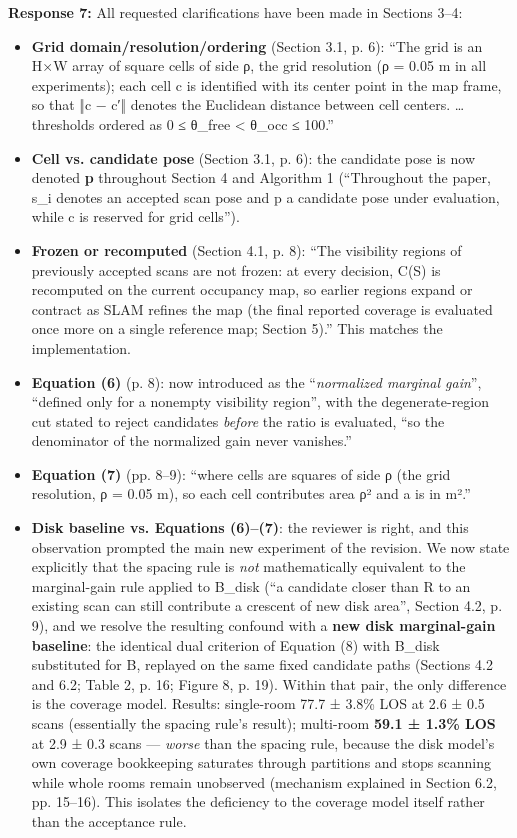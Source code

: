\documentclass[11pt]{article}
\begin{document}
\textbf{Response 7:} All requested clarifications have been made in Sections 3–4:
\begin{itemize}
\item \textbf{Grid domain/resolution/ordering} (Section 3.1, p. 6): “The grid is an H×W array of square cells of side ρ, the grid resolution (ρ = 0.05 m in all experiments); each cell c is identified with its center point in the map frame, so that ‖c − c′‖ denotes the Euclidean distance between cell centers. … thresholds ordered as 0 ≤ θ\_free < θ\_occ ≤ 100.”
\item \textbf{Cell vs. candidate pose} (Section 3.1, p. 6): the candidate pose is now denoted \textbf{p} throughout Section 4 and Algorithm 1 (“Throughout the paper, s\_i denotes an accepted scan pose and p a candidate pose under evaluation, while c is reserved for grid cells”).
\item \textbf{Frozen or recomputed} (Section 4.1, p. 8): “The visibility regions of previously accepted scans are not frozen: at every decision, C(S) is recomputed on the current occupancy map, so earlier regions expand or contract as SLAM refines the map (the final reported coverage is evaluated once more on a single reference map; Section 5).” This matches the implementation.
\item \textbf{Equation (6)} (p. 8): now introduced as the “\emph{normalized marginal gain}”, “defined only for a nonempty visibility region”, with the degenerate-region cut stated to reject candidates \emph{before} the ratio is evaluated, “so the denominator of the normalized gain never vanishes.”
\item \textbf{Equation (7)} (pp. 8–9): “where cells are squares of side ρ (the grid resolution, ρ = 0.05 m), so each cell contributes area ρ² and a is in m².”
\item \textbf{Disk baseline vs. Equations (6)–(7)}: the reviewer is right, and this observation prompted the main new experiment of the revision. We now state explicitly that the spacing rule is \emph{not} mathematically equivalent to the marginal-gain rule applied to B\_disk (“a candidate closer than R to an existing scan can still contribute a crescent of new disk area”, Section 4.2, p. 9), and we resolve the resulting confound with a \textbf{new disk marginal-gain baseline}: the identical dual criterion of Equation (8) with B\_disk substituted for B, replayed on the same fixed candidate paths (Sections 4.2 and 6.2; Table 2, p. 16; Figure 8, p. 19). Within that pair, the only difference is the coverage model. Results: single-room 77.7 ± 3.8\% LOS at 2.6 ± 0.5 scans (essentially the spacing rule’s result); multi-room \textbf{59.1 ± 1.3\% LOS} at 2.9 ± 0.3 scans — \emph{worse} than the spacing rule, because the disk model’s own coverage bookkeeping saturates through partitions and stops scanning while whole rooms remain unobserved (mechanism explained in Section 6.2, pp. 15–16). This isolates the deficiency to the coverage model itself rather than the acceptance rule.
\end{itemize}
\end{document}
